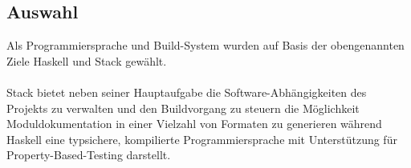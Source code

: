 \subsection{Auswahl}
Als Programmiersprache und Build-System wurden auf Basis der obengenannten Ziele
Haskell \cite{haskell} und Stack \cite{stack} gewählt.

\paragraph{}
Stack bietet neben seiner Hauptaufgabe die Software-Abhängigkeiten des Projekts
zu verwalten und den Buildvorgang zu steuern die Möglichkeit Moduldokumentation
in einer Vielzahl von Formaten zu generieren während Haskell eine typsichere,
kompilierte Programmiersprache mit Unterstützung für \gls{Property-Based-Testing}
darstellt.